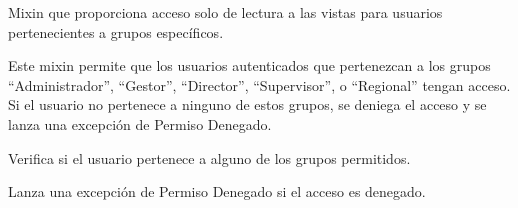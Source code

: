 \documentclass[letterpaper,10pt,spanish]{sphinxmanual}
\begin{document}
\begin{fulllineitems}

\pysigstartsignatures
{}
\pysigstopsignatures

\begin{fulllineitems}

\pysigstartsignatures
{}
\pysigstopsignatures
\end{fulllineitems}



\begin{fulllineitems}

\pysigstartsignatures
{}
\pysigstopsignatures
\sphinxAtStartPar
Mixin que proporciona acceso solo de lectura a las vistas para usuarios
pertenecientes a grupos específicos.

\sphinxAtStartPar
Este mixin permite que los usuarios autenticados que pertenezcan a
los grupos “Administrador”, “Gestor”, “Director”, “Supervisor”, o
“Regional” tengan acceso. Si el usuario no pertenece a ninguno de estos
grupos, se deniega el acceso y se lanza una excepción de Permiso Denegado.


\begin{fulllineitems}

\pysigstartsignatures
{}
\pysigstopsignatures
\sphinxAtStartPar
Verifica si el usuario pertenece a alguno de los grupos permitidos.

\end{fulllineitems}



\begin{fulllineitems}

\pysigstartsignatures
{}
\pysigstopsignatures
\sphinxAtStartPar
Lanza una excepción de Permiso Denegado si el acceso es denegado.

\end{fulllineitems}


\end{fulllineitems}


\end{fulllineitems}


\sphinxstepscope
\end{document}
